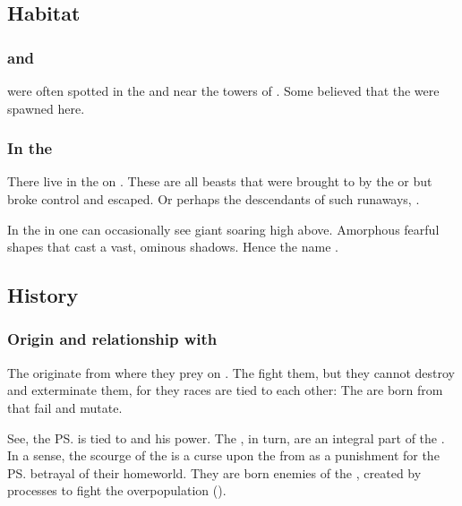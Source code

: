 \subsection{Habitat}





\subsubsection{\Carcosa and \Oggra}
\Umbrae were often spotted in the  and near the towers of . 
Some \resphain believed that the \umbrae were spawned here.





\subsubsection{In the \Wylde}
There live \umbrae{} in the \Wylde{} on \Miith. 
These are all beasts that were brought to \Miith{} by the \resphain{} or \banes{} but broke control and escaped. 
Or perhaps the descendants of such runaways, . 

In the \wylde in \Azmith one can occasionally see giant \umbrae soaring high above. 
Amorphous fearful shapes that cast a vast, ominous shadows.
Hence the name \quo{\umbra}. 









\subsection{History}





\subsubsection{Origin and relationship with \banes}
The \umbrae{} originate from \Erebos{} where they prey on \banes. 
The \banes{} fight them, but they cannot destroy and exterminate them, for they races are tied to each other: 
The \umbrae{} are born from \banes{} that fail and mutate.

See, the \ps{\banes}{} \matrixx{} is tied to \FatherErebos{} and his power. 
The \umbrae, in turn, are an integral part of the \bane{} \matrixx. 
In a sense, the scourge of the \umbrae{} is a curse upon the \banes{} from \FatherErebos{} as a punishment for the \ps{\banes}{} betrayal of their homeworld. 
They are born enemies of the \banes{}, created by  processes to fight the \bane{} overpopulation (). 





